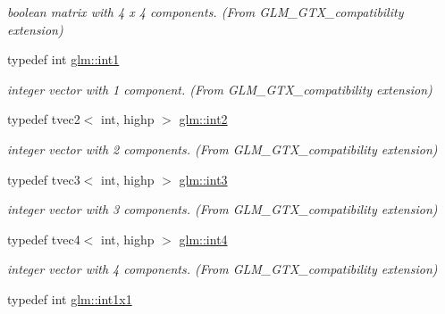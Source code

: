 \begin{DoxyCompactItemize}
\begin{DoxyCompactList}\small\item\em boolean matrix with 4 x 4 components. (From G\-L\-M\-\_\-\-G\-T\-X\-\_\-compatibility extension) \end{DoxyCompactList}\item 
\hypertarget{group__gtx__compatibility_gaba41d7803e4b24c17656d74377b88286}{typedef int \hyperlink{group__gtx__compatibility_gaba41d7803e4b24c17656d74377b88286}{glm\-::int1}}\label{group__gtx__compatibility_gaba41d7803e4b24c17656d74377b88286}

\begin{DoxyCompactList}\small\item\em integer vector with 1 component. (From G\-L\-M\-\_\-\-G\-T\-X\-\_\-compatibility extension) \end{DoxyCompactList}\item 
\hypertarget{group__gtx__compatibility_ga89f98d125d3e73b50e34bc35d93796f1}{typedef tvec2$<$ int, highp $>$ \hyperlink{group__gtx__compatibility_ga89f98d125d3e73b50e34bc35d93796f1}{glm\-::int2}}\label{group__gtx__compatibility_ga89f98d125d3e73b50e34bc35d93796f1}

\begin{DoxyCompactList}\small\item\em integer vector with 2 components. (From G\-L\-M\-\_\-\-G\-T\-X\-\_\-compatibility extension) \end{DoxyCompactList}\item 
\hypertarget{group__gtx__compatibility_gafc297ec294f5aa0360a634656c20e1d0}{typedef tvec3$<$ int, highp $>$ \hyperlink{group__gtx__compatibility_gafc297ec294f5aa0360a634656c20e1d0}{glm\-::int3}}\label{group__gtx__compatibility_gafc297ec294f5aa0360a634656c20e1d0}

\begin{DoxyCompactList}\small\item\em integer vector with 3 components. (From G\-L\-M\-\_\-\-G\-T\-X\-\_\-compatibility extension) \end{DoxyCompactList}\item 
\hypertarget{group__gtx__compatibility_gab93125af983ab22b9647b64770b26aa1}{typedef tvec4$<$ int, highp $>$ \hyperlink{group__gtx__compatibility_gab93125af983ab22b9647b64770b26aa1}{glm\-::int4}}\label{group__gtx__compatibility_gab93125af983ab22b9647b64770b26aa1}

\begin{DoxyCompactList}\small\item\em integer vector with 4 components. (From G\-L\-M\-\_\-\-G\-T\-X\-\_\-compatibility extension) \end{DoxyCompactList}\item 
\hypertarget{group__gtx__compatibility_ga09016a637a3cd093c22e6188080ac750}{typedef int \hyperlink{group__gtx__compatibility_ga09016a637a3cd093c22e6188080ac750}{glm\-::int1x1}}\label{group__gtx__compatibility_ga09016a637a3cd093c22e6188080ac750}


\end{DoxyCompactItemize}
